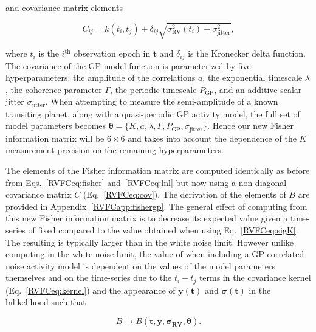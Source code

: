 \noindent and covariance matrix elements

\begin{equation}
  C_{ij} = k(t_i,t_j) + \delta_{ij} \sqrt{\sigma_{\text{RV}}^2(t_i) + \sigma_{\text{jitter}}^2},
  \label{RVFCeq:cov}
\end{equation}

\noindent where $t_i$ is the $i^{\text{th}}$ observation epoch in $\mathbf{t}$ and
$\delta_{ij}$ is the Kronecker delta function. The covariance of the GP model function is parameterized
by five hyperparameters: the amplitude of the correlations $a$, the exponential timescale $\lambda$,
the coherence parameter $\Gamma$, the periodic timescale $P_{\text{GP}}$, and an additive scalar jitter
$\sigma_{\text{jitter}}$.
When attempting to measure the semi-amplitude of a known transiting planet, along with a quasi-periodic GP
activity model, the full set of model parameters becomes
$\boldsymbol{\theta} = \{K, a, \lambda, \Gamma, P_{\text{GP}}, \sigma_{\text{jitter}} \}$. Hence our new Fisher
information matrix will be $6 \times 6$ and takes into account the dependence of the $K$
measurement precision on the remaining hyperparameters. 

The elements of the Fisher information matrix are computed identically as before from Eqs.~\ref{RVFCeq:fisher}
and~\ref{RVFCeq:lnl} but now using a non-diagonal covariance matrix $C$ (Eq.~\ref{RVFCeq:cov}). The derivation
of the elements of $B$ are provided in Appendix~\ref{RVFCapp:fishergp}. The general effect of computing \sigK{}
from this new Fisher information matrix is to decrease its expected value given a time-series of fixed
\nrv{} compared to the value obtained when using
Eq.~\ref{RVFCeq:sigK}. The resulting \nrv{} is typically larger than in the white noise limit.
However unlike computing \sigK{} in the white noise limit, the value of \sigK{} when including a
GP correlated noise activity model is dependent on the values of the model parameters themselves
and on the time-series due to the $t_i-t_j$ terms in the covariance kernel (Eq.~\ref{RVFCeq:kernel})
and the appearance of $\mathbf{y}(\mathbf{t})$ and
$\boldsymbol{\sigma}(\mathbf{t})$ in the lnlikelihood such that

\begin{equation}
  B \to B(\mathbf{t}, \mathbf{y}, \boldsymbol{\sigma_{\text{RV}}}, \boldsymbol{\theta}).
\end{equation}

